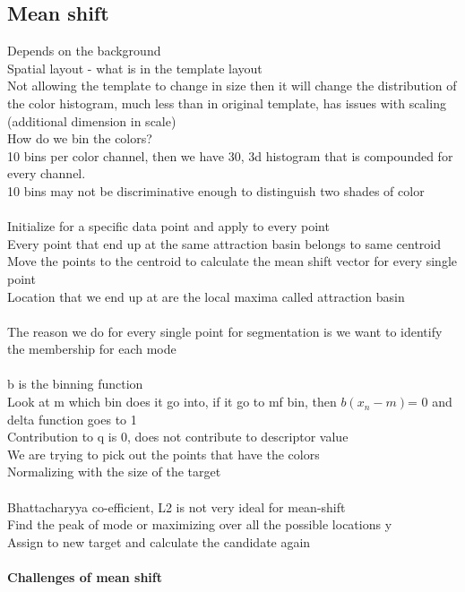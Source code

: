 \documentclass[11pt]{article}
\begin{document}
\subsection*{Mean shift}
Depends on the background\\
Spatial layout - what is in the template layout\\
Not allowing the template to change in size then it will change the distribution of the color histogram, much less than in original template, has issues with scaling (additional dimension in scale)
\\
How do we bin the colors?\\
10 bins per color channel, then we have 30, 3d histogram that is compounded for every channel.
\\
10 bins may not be discriminative enough to distinguish two shades of color\\
\\
Initialize for a specific data point and apply to every point\\
Every point that end up at the same attraction basin belongs to same centroid\\
Move the points to the centroid to calculate the mean shift vector for every single point\\
Location that we end up at are the local maxima called attraction basin\\\\
The reason we do for every single point for segmentation is we want to identify the membership for each mode
\\
\\
b is the binning function\\
Look at m which bin does it go into, if it go to mf bin, then $b(x_{n} - m) $= 0 and delta function goes to 1\\
Contribution to q is 0, does not contribute to descriptor value\\
We are trying to pick out the points that have the colors\\
Normalizing with the size of the target\\
\\
Bhattacharyya co-efficient, L2 is not very ideal for mean-shift\\
Find the peak of mode
or maximizing over all the possible locations y
\\
Assign to new target and calculate the candidate again\\\\
\textbf{Challenges of mean shift}\\
\end{document}
